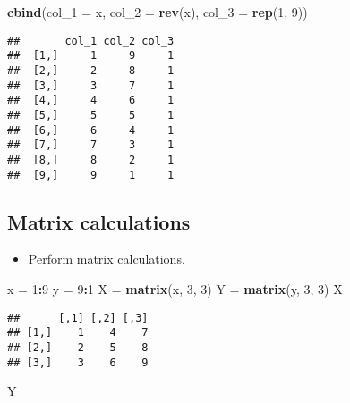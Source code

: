 \documentclass[]{book}
\newenvironment{Shaded}{\begin{snugshade}}{\end{snugshade}}
\newcommand{\DataTypeTok}[1]{\textcolor[rgb]{0.13,0.29,0.53}{#1}}
\newcommand{\DecValTok}[1]{\textcolor[rgb]{0.00,0.00,0.81}{#1}}
\newcommand{\KeywordTok}[1]{\textcolor[rgb]{0.13,0.29,0.53}{\textbf{#1}}}
\newcommand{\NormalTok}[1]{#1}
\newcommand{\OperatorTok}[1]{\textcolor[rgb]{0.81,0.36,0.00}{\textbf{#1}}}
\newcommand{\StringTok}[1]{\textcolor[rgb]{0.31,0.60,0.02}{#1}}
\providecommand{\tightlist}{%
  \setlength{\itemsep}{0pt}\setlength{\parskip}{0pt}}
\begin{document}
\begin{Shaded}
\begin{Highlighting}[]
\KeywordTok{cbind}\NormalTok{(}\DataTypeTok{col_1 =}\NormalTok{ x, }\DataTypeTok{col_2 =} \KeywordTok{rev}\NormalTok{(x), }\DataTypeTok{col_3 =} \KeywordTok{rep}\NormalTok{(}\DecValTok{1}\NormalTok{, }\DecValTok{9}\NormalTok{))}
\end{Highlighting}
\end{Shaded}

\begin{verbatim}
##       col_1 col_2 col_3
##  [1,]     1     9     1
##  [2,]     2     8     1
##  [3,]     3     7     1
##  [4,]     4     6     1
##  [5,]     5     5     1
##  [6,]     6     4     1
##  [7,]     7     3     1
##  [8,]     8     2     1
##  [9,]     9     1     1
\end{verbatim}

\hypertarget{matrix-calculations}{%
\subsection{Matrix calculations}\label{matrix-calculations}}

\begin{itemize}
\tightlist
\item
  Perform matrix calculations.
\end{itemize}

\begin{Shaded}
\begin{Highlighting}[]
\NormalTok{x =}\StringTok{ }\DecValTok{1}\OperatorTok{:}\DecValTok{9}
\NormalTok{y =}\StringTok{ }\DecValTok{9}\OperatorTok{:}\DecValTok{1}
\NormalTok{X =}\StringTok{ }\KeywordTok{matrix}\NormalTok{(x, }\DecValTok{3}\NormalTok{, }\DecValTok{3}\NormalTok{)}
\NormalTok{Y =}\StringTok{ }\KeywordTok{matrix}\NormalTok{(y, }\DecValTok{3}\NormalTok{, }\DecValTok{3}\NormalTok{)}
\NormalTok{X}
\end{Highlighting}
\end{Shaded}

\begin{verbatim}
##      [,1] [,2] [,3]
## [1,]    1    4    7
## [2,]    2    5    8
## [3,]    3    6    9
\end{verbatim}

\begin{Shaded}
\begin{Highlighting}[]
\NormalTok{Y}
\end{Highlighting}
\end{Shaded}
\end{document}
